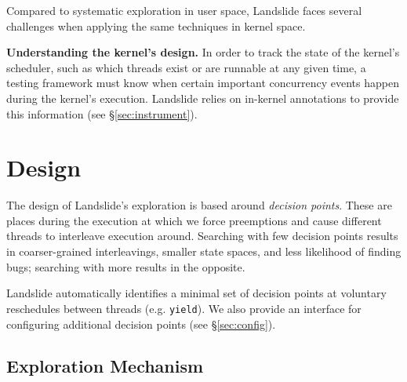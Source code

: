 \documentclass{llncs}
\begin{document}
Compared to systematic exploration in user space, Landslide faces several challenges when applying the same techniques in kernel space.


{\bf Understanding the kernel's design.} In order to track the state of the kernel's scheduler, such as which threads exist or are runnable at any given time, a testing framework must know when certain important concurrency events happen during the kernel's execution.
Landslide relies on in-kernel annotations to provide this information (see \S\ref{sec:instrument}).



\section{Design}
\label{sec:design}

The design of Landslide's exploration is based around {\em decision points}. These are places during the execution at which we force preemptions and cause different threads to interleave execution around. Searching with few decision points results in coarser-grained interleavings, smaller state spaces, and less likelihood of finding bugs; searching with more results in the opposite.

Landslide automatically identifies a minimal set of decision points at voluntary reschedules between threads (e.g. \texttt{yield}). We also provide an interface for configuring additional decision points (see \S\ref{sec:config}).

\subsection{Exploration Mechanism}
\end{document}
